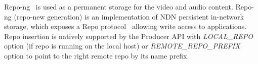 Repo-ng~\cite{repo-ng} is used as a permanent storage for the video and audio content. Repo-ng (repo-new generation) is an implementation of NDN persistent in-network storage, which exposes a Repo protocol~\cite{Repo-Protocol} allowing write access to applications. Repo insertion is natively supported by the Producer API with \textit{LOCAL\_REPO} option (if repo is running on the local host) or \textit{REMOTE\_REPO\_PREFIX} option to point to the right remote repo by its name prefix. 

\textbf{ }

\textbf{ }